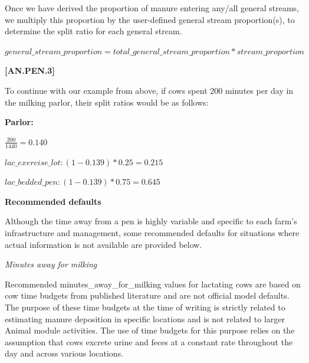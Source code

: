 \begin{refsection}
Once we have derived the proportion of manure entering any/all general streams, we multiply this proportion by the user-defined general stream proportion(s), to determine the split ratio for each general stream.
\vspace{0.2cm}

    \begin{center}
        \(general\_stream\_proportion = total\_general\_stream\_proportion * stream\_proportion\)
    \end{center}
        \vspace{0.5cm}
    
            {\raggedleft \textbf{[AN.PEN.3]}\par}
            \vspace{0.5cm}

To continue with our example from above, if cows spent 200 minutes per day in the milking parlor, their split ratios would be as follows: 
\vspace{0.25cm}

\textbf{Parlor:}
\vspace{0.2cm}

\( \frac{200}{1440} = 0.140\)
\vspace{0.1cm}

\(lac\_exercise\_lot: (1 - 0.139) * 0.25 = 0.215\)
\vspace{0.1cm}

\(lac\_bedded\_pen: (1 - 0.139) * 0.75 = 0.645\)
\vspace{0.3cm}

\textbf{Recommended defaults}
\vspace{0.2cm}

Although the time away from a pen is highly variable and specific to each farm’s infrastructure and management, some recommended defaults for situations where actual information is not available are provided below. 
\vspace{0.15cm}

\textit{Minutes away for milking}
\vspace{0.1cm}

Recommended minutes\_away\_for\_milking values for lactating cows are based on cow time budgets from published literature and are not official model defaults. The purpose of these time budgets at the time of writing is strictly related to estimating manure deposition in specific locations and is not related to larger Animal module activities. The use of time budgets for this purpose relies on the assumption that cows excrete urine and feces at a constant rate throughout the day and across various locations.
\vspace{0.1cm}



\end{refsection}

